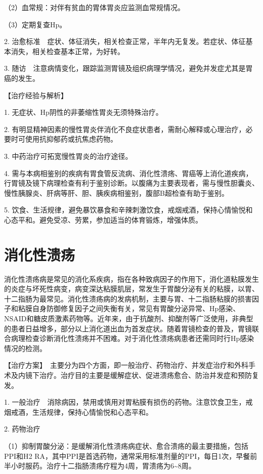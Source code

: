 （2）血常规：对伴有贫血的胃体胃炎应监测血常规情况。

（3）定期复查Hp。

2.
治愈标准　症状、体征消失，相关检查正常，半年内无复发。若症状、体征基本消失，相关检查基本正常，为好转。

3.
随访　注意病情变化，跟踪监测胃镜及组织病理学情况，避免并发症尤其是胃癌的发生。

【治疗经验与解析】

1. 无症状、Hp阴性的非萎缩性胃炎无须特殊治疗。

2.
有明显精神因素的慢性胃炎伴消化不良症状患者，需耐心解释或心理治疗，必要时可使用抗抑郁药或抗焦虑药物。

3. 中药治疗可拓宽慢性胃炎的治疗途径。

4.
需与本病相鉴别的疾病有胃食管反流病、消化性溃疡、胃癌等上消化道疾病，行胃镜及镜下病理检查有利于鉴别诊断。以腹痛为主要表现者，需与慢性胆囊炎、慢性胰腺炎、肝病等肝、胆、胰疾病相鉴别，腹部B超检查有助于鉴别。

5.
饮食、生活规律，避免暴饮暴食和辛辣刺激饮食，戒烟戒酒，保持心情愉悦和心态平和。避免受凉、劳累，参加适当的体育锻炼，增强体质。

\section{消化性溃疡}

消化性溃疡病是常见的消化系疾病，指在各种致病因子的作用下，消化道粘膜发生的炎症与坏死性病变，病变深达粘膜肌层，常发生于胃酸分泌有关的粘膜，以胃、十二指肠为最常见。消化性溃疡病的发病机制，主要与胃、十二指肠粘膜的损害因子和粘膜自身防御修复因子之间失衡有关，常见有胃酸分泌异常、Hp感染、NSAID和糖皮质激素药物等。近年来，由于抗酸剂、抑酸剂等广泛使用，非典型的患者日益增多，部分以上消化道出血为首发症状。随着胃镜检查的普及，胃镜联合病理检查诊断消化性溃疡并不困难。对于消化性溃疡病患者还需同时行Hp感染情况的检测。

【治疗方案】　主要分为四个方面，即一般治疗、药物治疗、并发症治疗和外科手术及内镜下治疗。治疗目的主要是缓解症状、促进溃疡愈合、防治并发症和预防复发。

1.
一般治疗　消除病因，禁用或慎用对胃粘膜有损伤的药物。注意饮食卫生，戒烟戒酒，生活规律，保持心情愉悦和心态平和。

2. 药物治疗

（1）抑制胃酸分泌：是缓解消化性溃疡病症状、愈合溃疡的最主要措施，包括PPI和H{2}
RA，其中PPI是首选药物，通常采用标准剂量的PPI，每日1次，早餐前半小时服药。治疗十二指肠溃疡疗程为4周，胃溃疡为6\textasciitilde{}8周。

